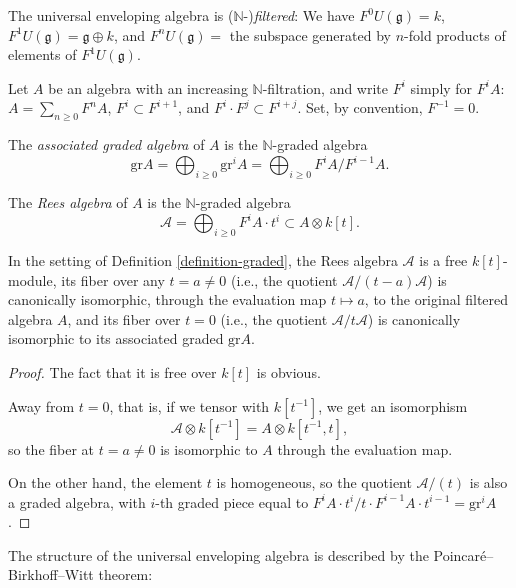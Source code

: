 The universal enveloping algebra is ($\mathbb N$-)\emph{filtered}: We have $F^0 U(\mathfrak g)= k$, $F^1 U(\mathfrak g) = \mathfrak g \oplus k$, and $F^n U(\mathfrak g) = $ the subspace generated by $n$-fold products of elements of $F^1 U(\mathfrak g)$.

\begin{definition}
 \label{definition-graded}
Let $A$ be an algebra with an increasing $\mathbb N$-filtration, and write $F^i$ simply for $F^i A$: $A=\sum_{n\ge 0} F^n A$, $F^i\subset F^{i+1}$, and $F^i \cdot F^j \subset F^{i+j}$. Set, by convention, $F^{-1}=0$.

The {\it associated graded algebra} of $A$ is the $\mathbb N$-graded algebra $$\text{gr} A = \bigoplus_{i\ge 0} \text{gr}^i A = \bigoplus_{i\ge 0} F^i A/ F^{i-1}A.$$ 

The {\it Rees algebra} of $A$ is the $\mathbb N$-graded algebra $$\mathcal A = \bigoplus_{i\ge 0} F^i A \cdot t^i \subset A\otimes k[t].$$

\end{definition}

\begin{lemma}
\label{lemma-Reesalgebra}
 In the setting of Definition \ref{definition-graded}, the Rees algebra $\mathcal A$ is a free $k[t]$-module, its fiber over any $t=a\ne 0$ (i.e., the quotient $\mathcal A/(t-a)\mathcal A$) is canonically isomorphic, through the evaluation map $t\mapsto a$, to the original filtered algebra $A$, and its fiber over $t=0$ (i.e., the quotient $\mathcal A/t\mathcal A$) is canonically isomorphic to its associated graded $\text{gr} A$.
\end{lemma}

\begin{proof}
 The fact that it is free over $k[t]$ is obvious.
 
 Away from $t=0$, that is, if we tensor with $k[t^{-1}]$, we get an isomorphism 
 $$ \mathcal A\otimes k[t^{-1}] = A \otimes k[t^{-1}, t],$$
 so the fiber at $t=a\ne 0$ is isomorphic to $A$ through the evaluation map.
 
 On the other hand, the element $t$ is homogeneous, so the quotient $\mathcal A/(t)$ is also a graded algebra, with $i$-th graded piece equal to $F^i A \cdot t^i / t\cdot F^{i-1} A \cdot t^{i-1}= \text{gr}^i A$. 
 
\end{proof}


The structure of the universal enveloping algebra is described by the Poincar\'e--Birkhoff--Witt theorem:


